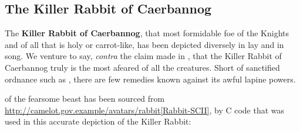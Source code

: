 \documentclass{metanorma}
\begin{document}
\subsection{The Killer Rabbit of Caerbannog}
\label{killer_rabbit_caerbannog}



The \textbf{Killer Rabbit of Caerbannog}, that most formidable foe of
the Knights and of all that is holy or carrot-like, has been
depicted diversely in lay and in song. We venture to say,
\textit{contra} the claim made in ,
that the Killer Rabbit of Caerbannog truly is the most afeared
of all the creatures. Short of sanctified ordnance such as
, there are few remedies
known against its awful lapine powers.



 of the fearsome beast
has been sourced from
\url{http://camelot.gov.example/avatars/rabbit[Rabbit-SCII]},
by C code that was used in this accurate depiction of the
Killer Rabbit:


\end{document}
